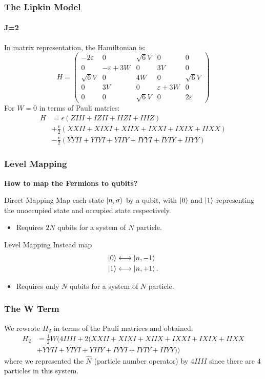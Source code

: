 \documentclass{beamer}
\begin{document}
\begin{frame}[t]
	\frametitle{The Lipkin Model}
	\framesubtitle{J=2}
	In matrix representation, the Hamiltonian is:
	\[H =
	\begin{pmatrix}
	-2\varepsilon & 0 & \sqrt{6}V & 0 & 0 \\
	0 & -\varepsilon + 3W & 0 & 3V & 0 \\
	\sqrt{6}V & 0 & 4W & 0 & \sqrt{6}V \\
	0 & 3V & 0 & \varepsilon + 3W & 0 \\
	0 & 0 & \sqrt{6}V & 0 & 2\varepsilon
\end{pmatrix} \]
For $ W = 0 $  in terms of Pauli matries:
\[\begin{aligned}
		H &= \epsilon\left( ZIII + IZII + IIZI + IIIZ \right) \\
		  &+ \frac{v}{2} (XXII + XIXI + XIIX + IXXI + IXIX + IIXX) \\
		  &- \frac{v}{2} (YYII + YIYI + YIIY + IYYI + IYIY + IIYY)
\end{aligned} \] 

\end{frame}

\begin{frame}[t]
	\frametitle{Level Mapping}
	\textbf{How to map the Fermions to qubits?} 
	\begin{block}{Direct Mapping}
		Map each state $ \ket{n, \sigma} $  by a qubit, with $ \ket{0} $ and $ \ket{1} $ representing the unoccupied state and occupied state respectively. 
		\begin{itemize}
			\item Requires $ 2N $ qubits for a system of $ N $ particle.
		\end{itemize}
	\end{block}
	\begin{block}{Level Mapping}
		Instead map 
		\[ 
		\begin{aligned}
			\ket{0} &\longleftrightarrow \ket{n, -1} \\
			\ket{1} &\longleftrightarrow \ket{n, +1}.
		\end{aligned}\] 
		\begin{itemize}
			\item Requires only $ N $ qubits for a system of $ N $ particle.
		\end{itemize}
	\end{block}
\end{frame}

\begin{frame}[t]
	\frametitle{The W Term}
	We rewrote $ H_2 $ in terms of the Pauli matrices and obtained:
	\[ 	
	\begin{aligned}
			H_2 &= \frac{1}{2}W ( 4IIII + 2 (XXII + XIXI + XIIX + IXXI + IXIX + IIXX \\ 
		&+ YYII + YIYI + YIIY + IYYI + IYIY + IIYY))
		\end{aligned}\]
where we represented the $ \hat N $ (particle number operator) by $ 4IIII $ since there are $ 4 $ particles in this system.
\end{frame}
\end{document}
